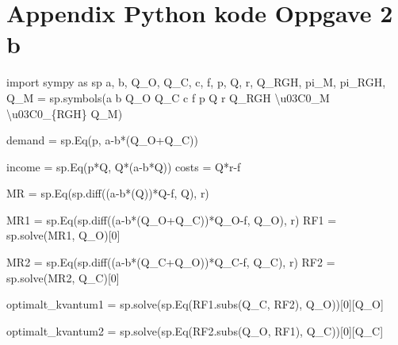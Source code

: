 \documentclass[
  12pt,
  a4paper,
  DIV=11,
  numbers=noendperiod]{scrartcl}
\newenvironment{Shaded}{\begin{snugshade}}{\end{snugshade}}
\newcommand{\CharTok}[1]{\textcolor[rgb]{0.13,0.47,0.30}{#1}}
\newcommand{\DecValTok}[1]{\textcolor[rgb]{0.68,0.00,0.00}{#1}}
\newcommand{\ImportTok}[1]{\textcolor[rgb]{0.00,0.46,0.62}{#1}}
\newcommand{\NormalTok}[1]{\textcolor[rgb]{0.00,0.23,0.31}{#1}}
\newcommand{\OperatorTok}[1]{\textcolor[rgb]{0.37,0.37,0.37}{#1}}
\newcommand{\SpecialCharTok}[1]{\textcolor[rgb]{0.37,0.37,0.37}{#1}}
\newcommand{\StringTok}[1]{\textcolor[rgb]{0.13,0.47,0.30}{#1}}
\begin{document}
\clearpage

\section {Appendix Python kode Oppgave 2 b}

\begin{Shaded}
\begin{Highlighting}[]
\ImportTok{import}\NormalTok{ sympy }\ImportTok{as}\NormalTok{ sp}
\NormalTok{a, b, Q\_O, Q\_C, c, f, p, Q, r, Q\_RGH, pi\_M, pi\_RGH, Q\_M }\OperatorTok{=}\NormalTok{ sp.symbols(}\StringTok{\textquotesingle{}a b Q\_O Q\_C c f p Q r Q\_RGH }\CharTok{\textbackslash{}u03C0}\StringTok{\_M }\CharTok{\textbackslash{}u03C0}\StringTok{\_}\SpecialCharTok{\{RGH\}}\StringTok{ Q\_M\textquotesingle{}}\NormalTok{)}


\NormalTok{demand }\OperatorTok{=}\NormalTok{ sp.Eq(p, a}\OperatorTok{{-}}\NormalTok{b}\OperatorTok{*}\NormalTok{(Q\_O}\OperatorTok{+}\NormalTok{Q\_C))}

\NormalTok{income }\OperatorTok{=}\NormalTok{ sp.Eq(p}\OperatorTok{*}\NormalTok{Q, Q}\OperatorTok{*}\NormalTok{(a}\OperatorTok{{-}}\NormalTok{b}\OperatorTok{*}\NormalTok{Q))}
\NormalTok{costs }\OperatorTok{=}\NormalTok{ Q}\OperatorTok{*}\NormalTok{r}\OperatorTok{{-}}\NormalTok{f}

\NormalTok{MR }\OperatorTok{=}\NormalTok{ sp.Eq(sp.diff((a}\OperatorTok{{-}}\NormalTok{b}\OperatorTok{*}\NormalTok{(Q))}\OperatorTok{*}\NormalTok{Q}\OperatorTok{{-}}\NormalTok{f, Q), r)}

\NormalTok{MR1 }\OperatorTok{=}\NormalTok{ sp.Eq(sp.diff((a}\OperatorTok{{-}}\NormalTok{b}\OperatorTok{*}\NormalTok{(Q\_O}\OperatorTok{+}\NormalTok{Q\_C))}\OperatorTok{*}\NormalTok{Q\_O}\OperatorTok{{-}}\NormalTok{f, Q\_O), r)}
\NormalTok{RF1  }\OperatorTok{=}\NormalTok{ sp.solve(MR1, Q\_O)[}\DecValTok{0}\NormalTok{]}

\NormalTok{MR2 }\OperatorTok{=}\NormalTok{ sp.Eq(sp.diff((a}\OperatorTok{{-}}\NormalTok{b}\OperatorTok{*}\NormalTok{(Q\_C}\OperatorTok{+}\NormalTok{Q\_O))}\OperatorTok{*}\NormalTok{Q\_C}\OperatorTok{{-}}\NormalTok{f, Q\_C), r)}
\NormalTok{RF2 }\OperatorTok{=}\NormalTok{ sp.solve(MR2, Q\_C)[}\DecValTok{0}\NormalTok{]}

\NormalTok{optimalt\_kvantum1 }\OperatorTok{=}\NormalTok{ sp.solve(sp.Eq(RF1.subs(Q\_C, RF2), Q\_O))[}\DecValTok{0}\NormalTok{][Q\_O]}

\NormalTok{optimalt\_kvantum2 }\OperatorTok{=}\NormalTok{ sp.solve(sp.Eq(RF2.subs(Q\_O, RF1), Q\_C))[}\DecValTok{0}\NormalTok{][Q\_C]}




\end{Highlighting}
\end{Shaded}
\end{document}
